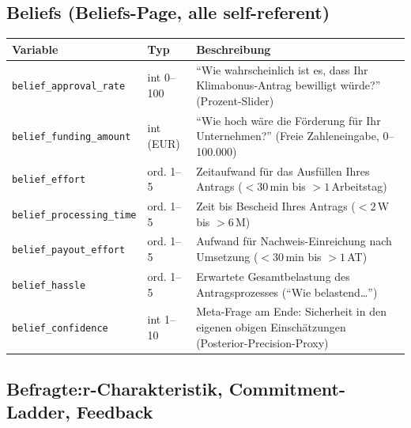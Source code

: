 \documentclass[11pt, a4paper]{scrartcl}
\newcommand{\var}[1]{\texttt{\small #1}}
\begin{document}
\subsection{Beliefs (Beliefs-Page, alle self-referent)}

\begin{longtable}{@{}p{3.8cm} p{2.0cm} p{9.3cm}@{}}
\toprule
\textbf{Variable} & \textbf{Typ} & \textbf{Beschreibung} \\
\midrule
\endhead
\var{belief\_approval\_rate}      & int 0--100   & \enquote{Wie wahrscheinlich ist es, dass Ihr Klimabonus-Antrag bewilligt würde?} (Prozent-Slider) \\
\var{belief\_funding\_amount}     & int (EUR)    & \enquote{Wie hoch wäre die Förderung für Ihr Unternehmen?} (Freie Zahleneingabe, 0--100.000) \\
\var{belief\_effort}              & ord. 1--5    & Zeitaufwand für das Ausfüllen Ihres Antrags ($<\!30\,$min bis $>\!1\,$Arbeitstag) \\
\var{belief\_processing\_time}    & ord. 1--5    & Zeit bis Bescheid Ihres Antrags ($<\!2\,$W bis $>\!6\,$M) \\
\var{belief\_payout\_effort}      & ord. 1--5    & Aufwand für Nachweis-Einreichung nach Umsetzung ($<\!30\,$min bis $>\!1\,$AT) \\
\var{belief\_hassle}              & ord. 1--5    & Erwartete Gesamtbelastung des Antragsprozesses (\enquote{Wie belastend\ldots}) \\
\var{belief\_confidence}          & int 1--10    & Meta-Frage am Ende: Sicherheit in den eigenen obigen Einschätzungen (Posterior-Precision-Proxy) \\
\bottomrule
\end{longtable}

\subsection{Befragte:r-Charakteristik, Commitment-Ladder, Feedback}
\end{document}
